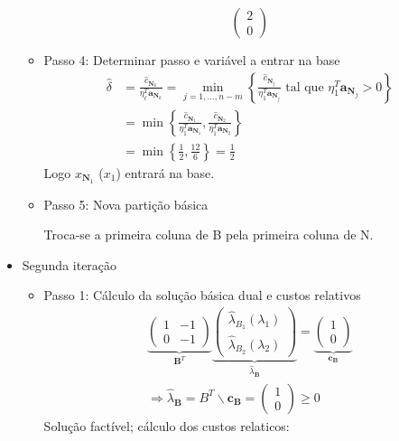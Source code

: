 \documentclass{article}
\begin{document}
\begin{itemize}
\begin{itemize}
\[\begin{pmatrix}
2\\
0
\end{pmatrix}
\]
		\item Passo 4: Determinar passo e variável a entrar na base
\begin{align*}
\widehat{\delta}&=\frac{\widehat{c}_{\mathbf{N}_k}}{\eta_\ell^T \mathbf{a}_{\mathbf{N}_k}}
=\min_{j=1,...,n-m}\left\{\frac{\widehat{c}_{\mathbf{N}_j}}{\eta_1^T \mathbf{a}_{\mathbf{N}_j}} \text { tal que } \eta_1^T \mathbf{a}_{\mathbf{N}_j}>0\right\}\\
&=\min \left\{
\frac{\widehat{c}_{\mathbf{N}_1}}{\eta_{1}^T \mathbf{a}_{\mathbf{N}_1}}, \frac{\widehat{c}_{\mathbf{N}_2}}{\eta_{1}^T \mathbf{a}_{\mathbf{N}_2}}
\right\}\\
&=\min \left\{
\frac{1}{2}, \frac{12}{6}
\right\}=\frac{1}{2}
\end{align*}
Logo $x_{\mathbf{N}_1}$ ($x_1$) entrará na base.
		\item Passo 5: Nova partição básica

Troca-se a primeira coluna de B pela primeira coluna de N.
	\end{itemize}
	\item Segunda iteração
	\begin{itemize}
\item Passo 1: Cálculo da solução básica dual e custos relativos
$$
\begin{gathered}
\underbrace{\left(\begin{array}{cc}
1 & -1 \\
0 & -1
\end{array}\right)}_{\mathbf{B}^{T}} \underbrace{\left(\begin{array}{l}
\hat{\lambda}_{B_{1}}\left(\lambda_{1}\right) \\
\hat{\lambda}_{B_{2}}\left(\lambda_{2}\right)
\end{array}\right)}_{\hat{\lambda}_{\mathbf{B}}}=\underbrace{\left(\begin{array}{l}
1 \\
0
\end{array}\right)}_{\mathbf{c}_{\mathbf{B}}} \\
\Rightarrow \hat{\lambda}_{\mathbf{B}}=B^{T} \backslash \mathbf{c}_{\mathbf{B}}=\left(\begin{array}{l}
1 \\
0
\end{array}\right) \geq 0
\end{gathered}
$$
Solução factível; cálculo dos custos relaticos: 


\end{itemize}
\end{itemize}
\end{document}
